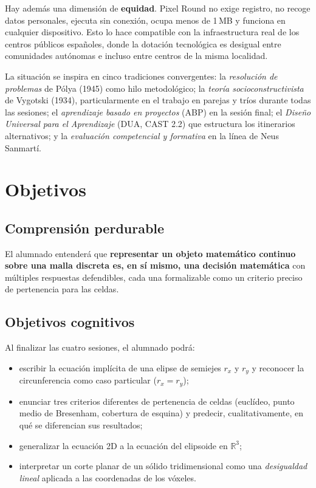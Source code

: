 \documentclass[12pt,a4paper]{scrartcl}
\newcommand{\acc}[1]{\textcolor{accent}{\textbf{#1}}}
\begin{document}
Hay además una dimensión de \acc{equidad}. Pixel Round no exige registro, no recoge datos personales, ejecuta sin conexión, ocupa menos de 1\,MB y funciona en cualquier dispositivo. Esto lo hace compatible con la infraestructura real de los centros públicos españoles, donde la dotación tecnológica es desigual entre comunidades autónomas e incluso entre centros de la misma localidad.

\begin{nota}
La situación se inspira en cinco tradiciones convergentes: la \emph{resolución de problemas} de Pólya (1945) como hilo metodológico; la \emph{teoría socioconstructivista} de Vygotski (1934), particularmente en el trabajo en parejas y tríos durante todas las sesiones; el \emph{aprendizaje basado en proyectos} (ABP) en la sesión final; el \emph{Diseño Universal para el Aprendizaje} (DUA, CAST 2.2) que estructura los itinerarios alternativos; y la \emph{evaluación competencial y formativa} en la línea de Neus Sanmartí.
\end{nota}

\section{Objetivos}

\subsection{Comprensión perdurable}

El alumnado entenderá que \acc{representar un objeto matemático continuo sobre una malla discreta es, en sí mismo, una decisión matemática} con múltiples respuestas defendibles, cada una formalizable como un criterio preciso de pertenencia para las celdas.

\subsection{Objetivos cognitivos}

Al finalizar las cuatro sesiones, el alumnado podrá:

\begin{itemize}[leftmargin=1.3em,itemsep=0.15em,topsep=0.3em]
  \item escribir la ecuación implícita de una elipse de semiejes $r_x$ y $r_y$ y reconocer la circunferencia como caso particular ($r_x = r_y$);
  \item enunciar tres criterios diferentes de pertenencia de celdas (euclídeo, punto medio de Bresenham, cobertura de esquina) y predecir, cualitativamente, en qué se diferencian sus resultados;
  \item generalizar la ecuación 2D a la ecuación del elipsoide en $\mathbb{R}^3$;
  \item interpretar un corte planar de un sólido tridimensional como una \emph{desigualdad lineal} aplicada a las coordenadas de los vóxeles.
\end{itemize}
\end{document}
